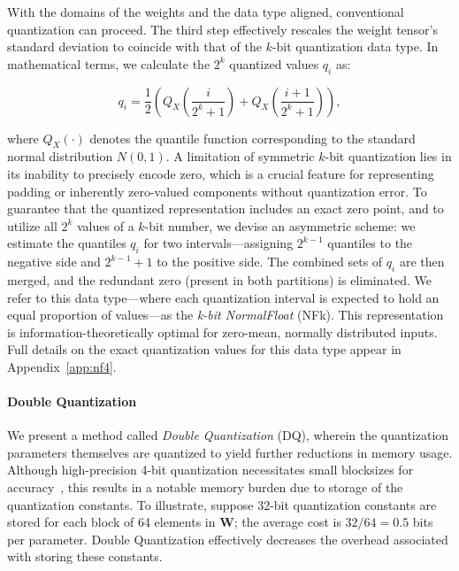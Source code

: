 With the domains of the weights and the data type aligned, conventional quantization can proceed. The third step effectively rescales the weight tensor’s standard deviation to coincide with that of the $k$-bit quantization data type. In mathematical terms, we calculate the $2^k$ quantized values $q_i$ as:

\begin{equation}
q_i  = \frac{1}{2}\left( Q_X\left(\frac{i}{2^k+1}\right) + Q_X\left(\frac{i+1}{2^k+1}\right)\right),
\end{equation}

where $Q_X(\cdot)$ denotes the quantile function corresponding to the standard normal distribution $N(0,1)$. A limitation of symmetric $k$-bit quantization lies in its inability to precisely encode zero, which is a crucial feature for representing padding or inherently zero-valued components without quantization error. To guarantee that the quantized representation includes an exact zero point, and to utilize all $2^k$ values of a $k$-bit number, we devise an asymmetric scheme: we estimate the quantiles $q_i$ for two intervals—assigning $2^{k-1}$ quantiles to the negative side and $2^{k-1}+1$ to the positive side. The combined sets of $q_i$ are then merged, and the redundant zero (present in both partitions) is eliminated. We refer to this data type—where each quantization interval is expected to hold an equal proportion of values—as the \emph{k-bit NormalFloat} (NFk). This representation is information-theoretically optimal for zero-mean, normally distributed inputs. Full details on the exact quantization values for this data type appear in Appendix~\ref{app:nf4}.

\paragraph{Double Quantization{}}
We present a method called \emph{Double Quantization} (DQ), wherein the quantization parameters themselves are quantized to yield further reductions in memory usage. Although high-precision 4-bit quantization necessitates small blocksizes for accuracy~\citep{dettmers2022case}, this results in a notable memory burden due to storage of the quantization constants. To illustrate, suppose 32-bit quantization constants are stored for each block of 64 elements in $\mathbf{W}$; the average cost is $32/64 = 0.5$ bits per parameter. Double Quantization effectively decreases the overhead associated with storing these constants.

